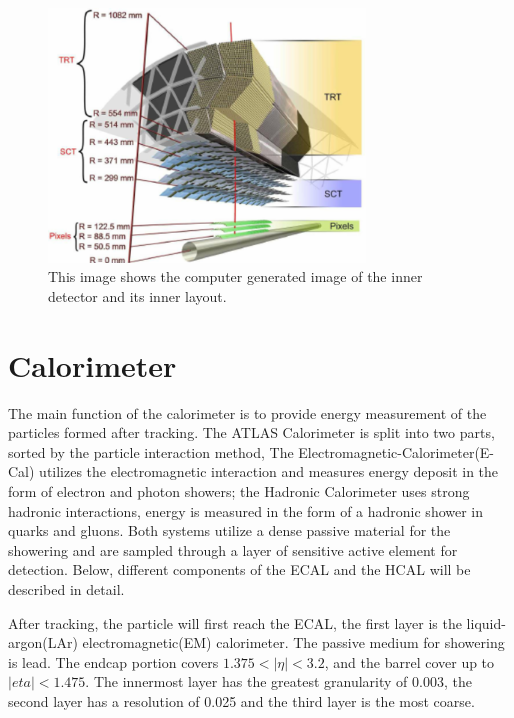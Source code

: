\begin{figure}[!htb]
    \begin{center}
        \includegraphics[width=0.75\textwidth]{figures/chapter_ATLAS/InnerDetector2}
        \caption{
		    This image shows the computer generated image of the inner detector and its inner layout. \cite{Pequenao:1095926}
        }
        \label{fig:InnerDetector2}
    \end{center}
\end{figure}

\section{Calorimeter}
The main function of the calorimeter is to provide energy measurement of the particles formed after tracking. The ATLAS Calorimeter is split into two parts, sorted by the particle interaction method, The Electromagnetic-Calorimeter(E-Cal) utilizes the electromagnetic interaction and measures energy deposit in the form of electron and photon showers; the Hadronic Calorimeter uses strong hadronic interactions, energy is measured in the form of a hadronic shower in quarks and gluons. Both
systems utilize a dense passive material for the showering and are sampled through a layer of sensitive active element for detection. Below, different components of the ECAL and the HCAL will be described in detail. 

After tracking, the particle will first reach the ECAL, the first layer is the liquid-argon(LAr) electromagnetic(EM) calorimeter. The passive medium for showering is lead. The endcap portion covers $1.375< |\eta| < 3.2$, and the barrel cover up to $|eta|<1.475$. The innermost layer has the greatest granularity of 0.003, the second layer has a resolution of 0.025 and the third layer is the most coarse. 

